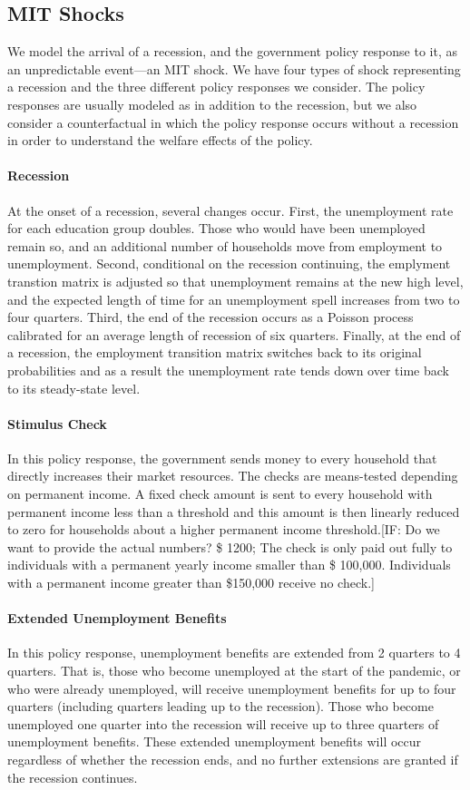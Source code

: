 \documentclass[../HAFiscal]{subfiles}
\begin{document}
	\subsection{MIT Shocks}
	We model the arrival of a recession, and the government policy response to it, as an unpredictable event---an MIT shock. We have four types of shock representing a recession and the three different policy responses we consider. The policy responses are usually modeled as in addition to the recession, but we also consider a counterfactual in which the policy response occurs without a recession in order to understand the welfare effects of the policy.
	
	\paragraph{Recession} At the onset of a recession, several changes occur. First, the unemployment rate for each education group doubles. Those who would have been unemployed remain so, and an additional number of households move from employment to unemployment. Second, conditional on the recession continuing, the emplyment transtion matrix is adjusted so that unemployment remains at the new high level, and the expected length of time for an unemployment spell increases from two to four quarters. Third, the end of the recession occurs as a Poisson process calibrated for an average length of recession of six quarters. Finally, at the end of a recession, the employment transition matrix switches back to its original probabilities and as a result the unemployment rate tends down over time back to its steady-state level.
	
	\paragraph{Stimulus Check} In this policy response, the government sends money to every household that directly increases their market resources. The checks are means-tested depending on permanent income. A fixed check amount is sent to every household with permanent income less than a threshold and this amount is then linearly reduced to zero for households about a higher permanent income threshold.[IF: Do we want to provide the actual numbers? \$ 1200; The check is only paid out fully to individuals with a permanent yearly income smaller than \$ 100,000. Individuals with a permanent income greater than \$150,000 receive no check.]
	
	\paragraph{Extended Unemployment Benefits} In this policy response, unemployment benefits are extended from 2 quarters to 4 quarters. That is, those who become unemployed at the start of the pandemic, or who were already unemployed, will receive unemployment benefits for up to four quarters (including quarters leading up to the recession). Those who become unemployed one quarter into the recession will receive up to three quarters of unemployment benefits. These extended unemployment benefits will occur regardless of whether the recession ends, and no further extensions are granted if the recession continues.
	
\end{document}
